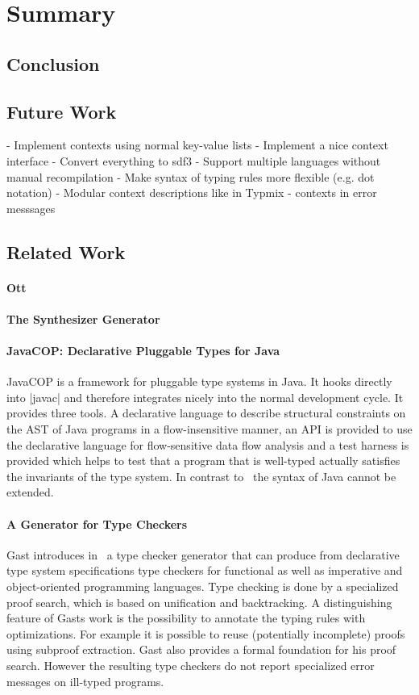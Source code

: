 \chapter{Summary}
\section{Conclusion}
\section{Future Work}
- Implement contexts using normal key-value lists
- Implement a nice context interface
- Convert everything to sdf3
- Support multiple languages without manual recompilation
- Make syntax of typing rules more flexible (e.g. dot notation)
- Modular context descriptions like in Typmix
- contexts in error messsages
\section{Related Work}
\subsubsection{Ott}
\subsubsection{The Synthesizer Generator}
\subsubsection{JavaCOP: Declarative Pluggable Types for Java}
JavaCOP \cite{Markstrum:2010:JDP:1667048.1667049} is a framework for
pluggable type systems in Java. It hooks directly into \code|javac|
and therefore integrates nicely into the normal development cycle. It
provides three tools. A declarative language to describe structural
constraints on the AST of Java programs in a flow-insensitive
manner, an API is provided to use the declarative language for
flow-sensitive data flow analysis and a test harness is provided which
helps to test that a program that is well-typed actually satisfies the
invariants of the type system. In contrast to~\cite{bergan2007typmix}
the syntax of Java cannot be extended.

\subsubsection{A Generator for Type Checkers}
Gast introduces in~\cite{gast2005generator} a type checker generator
that can produce from declarative type system specifications type
checkers for functional as well as imperative and object-oriented
programming languages. Type checking is done by a specialized proof
search, which is based on unification and backtracking. A
distinguishing feature of Gasts work is the possibility to annotate
the typing rules with optimizations. For example it is possible to
reuse (potentially incomplete) proofs using subproof extraction. Gast
also provides a formal foundation for his proof search. However the
resulting type checkers do not report specialized error messages on
ill-typed  programs.

